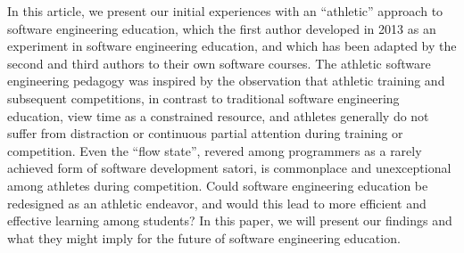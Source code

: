 In this article, we present our initial experiences with an ``athletic'' approach to software engineering education, which the first author developed in 2013 as an experiment in software engineering education, and which has been adapted by the second and third authors to their own software courses. The athletic software engineering pedagogy was inspired by the observation that athletic training and subsequent competitions, in contrast to traditional software engineering education, view time as a constrained resource, and athletes generally do not suffer from distraction or continuous partial attention during training or competition.  Even the ``flow state'', revered among programmers as a rarely achieved form of software development satori, is  commonplace and unexceptional among athletes during competition. Could software engineering education be redesigned as an athletic endeavor, and would this lead to more efficient and effective learning among students?  In this paper, we will present our findings and what they might imply for the future of software engineering education. 









 